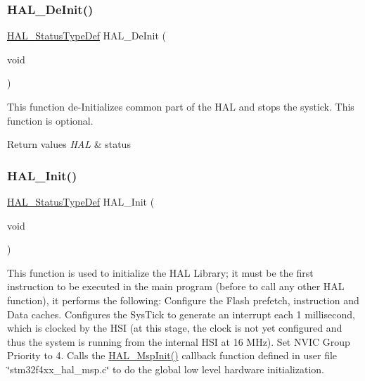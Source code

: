 \subsubsection{\texorpdfstring{H\+A\+L\+\_\+\+De\+Init()}{HAL\_DeInit()}}
{\footnotesize\ttfamily \hyperlink{stm32f4xx__hal__def_8h_a63c0679d1cb8b8c684fbb0632743478f}{H\+A\+L\+\_\+\+Status\+Type\+Def} H\+A\+L\+\_\+\+De\+Init (\begin{DoxyParamCaption}\item[{void}]{ }\end{DoxyParamCaption})}



This function de-\/\+Initializes common part of the H\+AL and stops the systick. This function is optional. 


\begin{DoxyRetVals}{Return values}
{\em H\+AL} & status \\
\hline
\end{DoxyRetVals}
\mbox{\label{group___h_a_l___exported___functions___group1_gaecac54d350c3730e6831eb404e557dc4}} 
\subsubsection{\texorpdfstring{H\+A\+L\+\_\+\+Init()}{HAL\_Init()}}
{\footnotesize\ttfamily \hyperlink{stm32f4xx__hal__def_8h_a63c0679d1cb8b8c684fbb0632743478f}{H\+A\+L\+\_\+\+Status\+Type\+Def} H\+A\+L\+\_\+\+Init (\begin{DoxyParamCaption}\item[{void}]{ }\end{DoxyParamCaption})}



This function is used to initialize the H\+AL Library; it must be the first instruction to be executed in the main program (before to call any other H\+AL function), it performs the following\+: Configure the Flash prefetch, instruction and Data caches. Configures the Sys\+Tick to generate an interrupt each 1 millisecond, which is clocked by the H\+SI (at this stage, the clock is not yet configured and thus the system is running from the internal H\+SI at 16 M\+Hz). Set N\+V\+IC Group Priority to 4. Calls the \hyperlink{group___h_a_l___exported___functions___group1_ga07e099a69ab23e79be8b7a80505de519}{H\+A\+L\+\_\+\+Msp\+Init()} callback function defined in user file \char`\"{}stm32f4xx\+\_\+hal\+\_\+msp.\+c\char`\"{} to do the global low level hardware initialization. 

